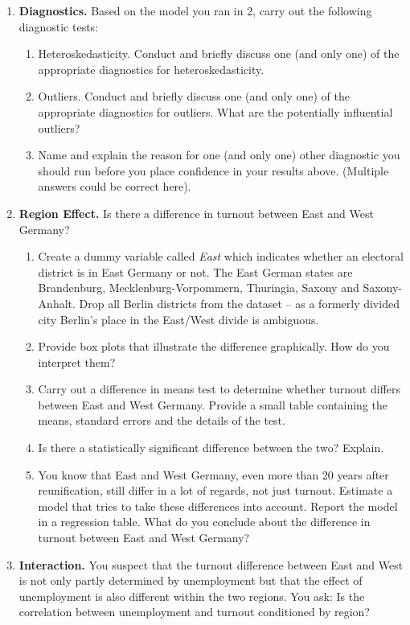 \documentclass[11pt,a4paper]{article}
\begin{document}
\begin{enumerate}
\begin{enumerate}
		\end{enumerate}
	\item \textbf{Diagnostics.} Based on the model you ran in 2, carry out the following diagnostic tests:
		\begin{enumerate}
			\item  Heteroskedasticity. Conduct and briefly discuss one (and only one) of the appropriate diagnostics for heteroskedasticity.
			\item Outliers. Conduct and briefly discuss one (and only one) of the appropriate diagnostics for outliers.  What are the potentially influential outliers?
			\item Name and explain the reason for one (and only one) other diagnostic you should run before you place confidence in your results above. (Multiple answers could be correct here).
		\end{enumerate}
	\item \textbf{Region Effect.} Is there a difference in turnout between East and West Germany? %
		\begin{enumerate}
			\item Create a dummy variable called \textit{East} which indicates whether an electoral district is in East Germany or not. The East German states are Brandenburg, Mecklenburg-Vorpommern, Thuringia, Saxony and Saxony-Anhalt. Drop all Berlin districts from the dataset -- as a formerly divided city Berlin's place in the East/West divide is ambiguous.
			\item Provide box plots that illustrate the difference graphically. How do you interpret them?
			\item Carry out a difference in means test to determine whether turnout differs between East and West Germany. Provide a small table containing the means, standard errors and the details of the test.
			\item Is there a statistically significant difference between the two? Explain.
			\item You know that East and West Germany, even more than 20 years after reunification, still differ in a lot of regards, not just turnout. Estimate a model that tries to take these differences into account. Report the model in a regression table. What do you conclude about the difference in turnout between East and West Germany?
		\end{enumerate}
	\item \textbf{Interaction.} You suspect that the turnout difference between East and West is not only partly determined by unemployment but that the effect of unemployment is also different within the two regions. You ask: Is the correlation between unemployment and turnout conditioned by region?	

\end{enumerate}
\end{document}
